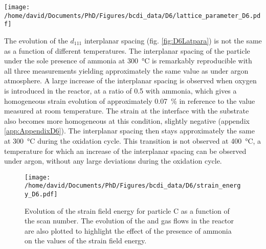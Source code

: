 \begin{SCfigure}
    \centering
    \texttt{[image: /home/david/Documents/PhD/Figures/bcdi\_data/D6/lattice\_parameter\_D6.pdf]}
    \caption{
        Evolution of the interplanar spacing $d_{111}$ and homogeneous strain $\epsilon_{111}$ for particle C as a function of the ammonia to oxygen ratio.
        The reference for the computation of $\epsilon_{111}$ was taken at \qty{25}{\degreeCelsius}.
        The reproduction of measurements at fixed conditions yields multiple data points, lines at \qty{300}{\degreeCelsius} and \qty{400}{\degreeCelsius} link the data points in the order of the measurements.
        No scans were performed at \qty{400}{\degreeCelsius} under Argon after the oxidation cycle.
    }
    \label{fig:D6Latpara}
\end{SCfigure}

The evolution of the $d_{111}$ interplanar spacing (fig. \ref{fig:D6Latpara}) is not the same as a function of different temperatures.
The interplanar spacing of the particle under the sole presence of ammonia at \qty{300}{\degreeCelsius} is remarkably reproducible with all three measurements yielding approximately the same value as under argon atmosphere.
A large increase of the interplanar spacing is observed when oxygen is introduced in the reactor, at a ratio of \num{0.5} with ammonia, which gives a homogeneous strain evolution of approximately \qty{0.07}{\percent} in reference to the value measured at room temperature.
The strain at the interface with the substrate also becomes more homogeneous at this condition, slightly negative (appendix \ref{app:AppendixD6}).
The interplanar spacing then stays approximately the same at \qty{300}{\degreeCelsius} during the oxidation cycle.
This transition is not observed at \qty{400}{\degreeCelsius}, a temperature for which an increase of the interplanar spacing can be observed under argon, without any large deviations during the oxidation cycle.

\begin{figure}[!htb]
    \centering
    \texttt{[image: /home/david/Documents/PhD/Figures/bcdi\_data/D6/strain\_energy\_D6.pdf]}
    \caption{
        Evolution of the strain field energy for particle C as a function of the scan number.
        The evolution of the  and  gas flows in the reactor are also plotted to highlight the effect of the presence of ammonia on the values of the strain field energy.
    }
    \label{fig:D6SFE}
\end{figure}

